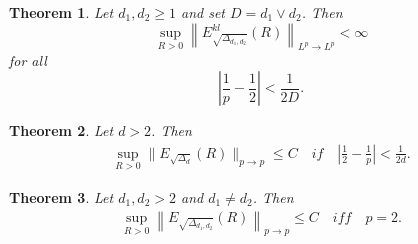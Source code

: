 \documentclass[10pt,a4paper]{amsart}
\newtheorem{theorem}{Theorem}
\newcommand\Lapd{\Delta_{d_1, d_2}}
\newcommand\Lapdd{\Delta_{d}}
\begin{document}
\begin{theorem}\label{herz_kl}
Let $d_1,d_2\ge 1$ and set $D=d_1\vee d_2$. Then
\[
    \sup_{R>0}\left\|E_{\sqrt{\Lapd}}^{kl}(R)\right\|_{L^p\to L^p}
    <\infty
\]
for all
\[
    \left|\frac{1}{p}-\frac{1}{2}\right|<\frac{1}{2D}.
\]
\end{theorem}

\begin{theorem}\label{herz_doubling}
Let $d>2$. Then 
\begin{align*}
    \sup_{R>0} \| E_{\sqrt{\Lapdd}}(R)\|_{p \to p} \le C \quad \textit{if} \quad 
        \left| \frac{1}{2} - \frac{1}{p} \right| < \frac{1}{2d}.
\end{align*}
\end{theorem}

  \begin{theorem}\label{fefferman_nondoubling}
Let $d_1,d_2>2$ and $d_1 \ne d_2$. Then
\begin{align*}
    \sup_{R>0} \left\| E_{\sqrt{\Lapd}}(R) \right\|_{p \to p} \le C \quad \textit{iff} \quad p=2.
\end{align*}

\end{theorem}
\end{document}
